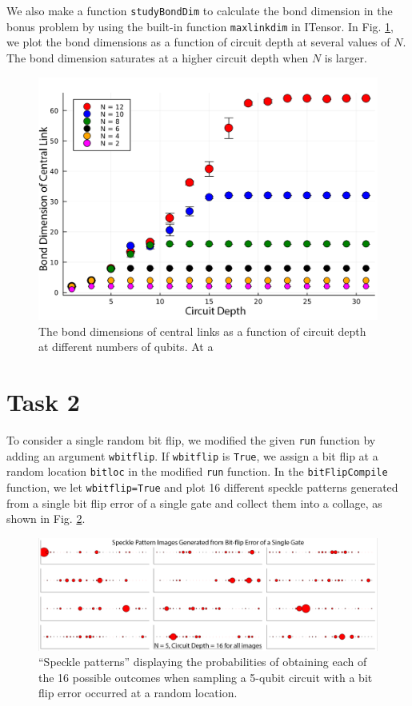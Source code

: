 \documentclass[12pt]{article}
\begin{document}
We also make a function \texttt{studyBondDim} to calculate the bond dimension in the bonus problem by using the built-in function \texttt{maxlinkdim} in ITensor. In Fig. \ref{fig:bonddim}, we plot  the bond dimensions as a function of circuit depth at several values of $N$. The bond dimension saturates at a higher circuit depth when $N$ is larger. %

\begin{figure}
	\centering
	\includegraphics [width=0.8\linewidth] {figures/Task1b}
	\caption{
		The bond dimensions of central links as a function of circuit depth at different numbers of qubits. At a 
	}
	\label{fig:bonddim}
\end{figure}



\section*{Task 2}

To consider a single random bit flip, we modified the given \texttt{run} function by adding an argument \texttt{wbitflip}. If \texttt{wbitflip} is \texttt{True}, we assign a bit flip at a random location \texttt{bitloc} in the modified \texttt{run} function. In the \texttt{bitFlipCompile} function, we let \texttt{wbitflip=True} and plot 16 different speckle patterns generated from a single bit flip error of a single gate and collect them into a collage, as shown in Fig. \ref{fig:bitflip}.

\begin{figure}
	\centering
	\includegraphics [width=\linewidth] {figures/Task2}
	\caption{
		 ``Speckle patterns'' displaying the probabilities of obtaining each of the 16 possible outcomes when sampling a 5-qubit circuit with a bit flip error occurred at a random location.
	}
	\label{fig:bitflip}
\end{figure}
\end{document}
